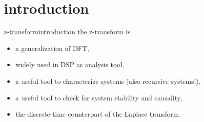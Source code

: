 


\subtitle{Part 16: z-transform}


	

\section[intro]{introduction}
	\begin{frame}{z-transform}{introduction}
        the z-transform is
        \begin{itemize}
            \item   a generalization of DFT,
            \smallskip
            \item   widely used in DSP as analysis tool,
            \smallskip
            \item   a useful tool to characterize systems (also recursive systems!),
            \smallskip
            \item   a useful tool to check for system stability and causality,
            \smallskip
            \item   the discrete-time counterpart of the Laplace transform.
        \end{itemize}
	\end{frame}

